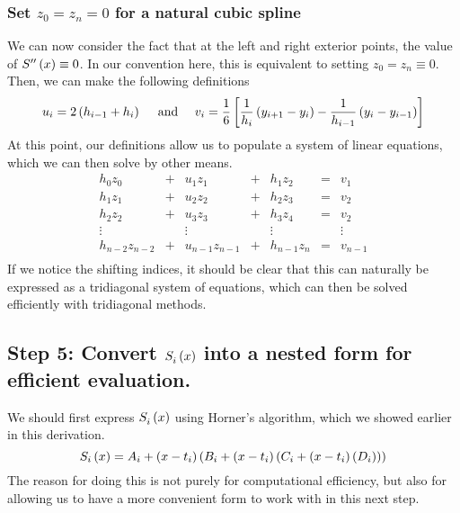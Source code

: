 \documentclass[letterpaper, 10pt, titlepage]{article}
\newcommand{\pp}{\paren}
\newcommand{\bb}{\brackets}
\newcommand{\primed}[1]{^{
    \ifthenelse
    {
        \equal{#1}{0}
    }
    {
    }
    {
        \foreach \x in {1,...,#1}{\prime}}
    }
}
\newcommand{\fs}[3]{\functionof{S_{#1}\primed{#2}}{#3}}
\begin{document}
\subsubsection*{Set $z_0 = z_n = 0$ for a natural cubic spline}
We can now consider the fact that at the left and right exterior points, the
value of $\fs{}{2}{x} \equiv 0$. In our convention here, this is equivalent to
setting $z_0 = z_n \equiv 0$. Then, we can make the following definitions
\begin{equation}
    u_i = 2\pp{h_{i-1} + h_i} \quad\text{ and }\quad
    v_i =
        \dfrac{1}{6}\bb{
            \dfrac{1}{h_i}\pp{
                y_{i+1}
                - y_i
            }
            - \dfrac{1}{h_{i-1}}\pp{
                y_{i}
                - y_{i-1}
            }
        }
\end{equation}
At this point, our definitions allow us to populate a system of linear
equations, which we can then solve by other means.
\begin{equation}
    \begin{array}{ccccccl}
        h_0z_0 & + & u_1z_1  & + & h_1z_2 & = &    v_1\\
        h_1z_1 & + & u_2z_2  & + & h_2z_3 & = &    v_2\\
        h_2z_2 & + & u_3z_3  & + & h_3z_4 & = &    v_2\\
        \vdots &   & \vdots  &   & \vdots &   & \vdots\\
        h_{n-2}z_{n-2} & + & u_{n-1}z_{n-1} & + & h_{n-1}z_n & = & v_{n-1}\\
    \end{array}
\end{equation}
If we notice the shifting indices, it should be clear that this can naturally be
expressed as a tridiagonal system of equations, which can then be solved
efficiently with tridiagonal methods.


\subsection*{Step 5: Convert $\fs{i}{0}{x}$ into a nested form for efficient
evaluation.}
We should first express $\fs{i}{0}{x}$ using Horner's algorithm, which we showed
earlier in this derivation.
\begin{equation}
    \functionof{S_i}{x} =
    A_i + \pp{x - t_i}\pp{B_i + \pp{x - t_i}\pp{C_i + \pp{x - t_i}\pp{D_i}}}
\end{equation}
The reason for doing this is not purely for computational efficiency, but also
for allowing us to have a more convenient form to work with in this next step.
\end{document}
